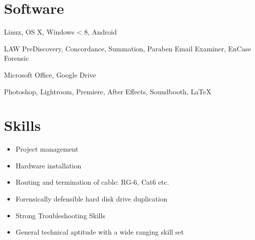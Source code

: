 \documentclass[line,margin]{res}
\begin{document}
\begin{resume}
\section{Software}
 \begin{description} [leftmargin=!,labelwidth=\widthof{\bfseries Operating Systems:}]
 \item[Operating Systems:] Linux, OS X, Windows < 8, Android
 \item[EDD Specific:] LAW PreDiscovery, Concordance, Summation, Paraben Email Examiner, EnCase Forensic
 \item[General:] Microsoft Office, Google Drive 
 \item[Design:] Photoshop, Lightroom, Premiere, After Effects, Soundbooth, \LaTeX
 \end{description}
\section{Skills}
 \begin{itemize} \itemsep -2pt
 \item Project management
 \item Hardware installation
 \item Routing and termination of cable: RG-6, Cat6 etc.  
 \item Forensically defensible hard disk drive duplication
 \item Strong Troubleshooting Skills
 \item General technical aptitude with a wide ranging skill set
 \end{itemize}
					

\end{resume}
\end{document}
